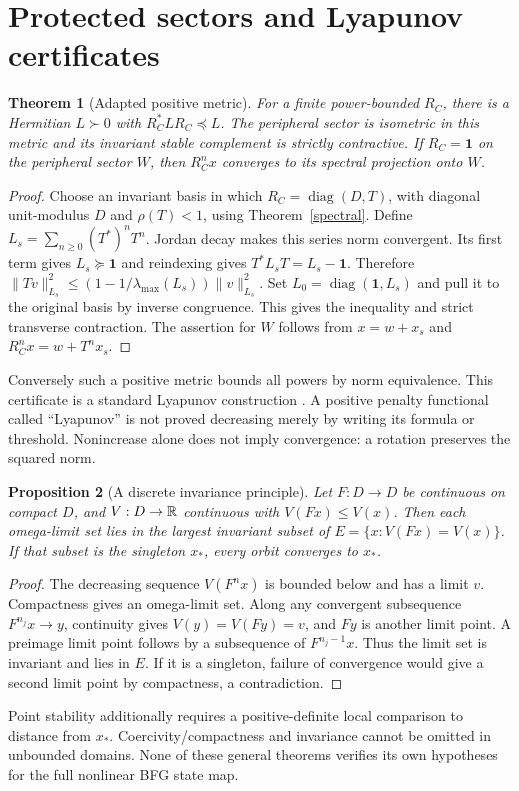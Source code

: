 \documentclass[11pt,letterpaper]{article}
\newcommand{\diag}{\operatorname{diag}}
\newcommand{\Id}{\mathbf 1}
\newtheorem{theorem}{Theorem}[section]
\newtheorem{proposition}[theorem]{Proposition}
\theoremstyle{definition}
\numberwithin{equation}{section}
\begin{document}
\section{Protected sectors and Lyapunov certificates}
\begin{theorem}[Adapted positive metric]\label{lyapunov}
For a finite power-bounded $R_C$, there is a Hermitian $L\succ0$ with $R_C^*LR_C\preceq L$. The peripheral sector is isometric in this metric and its invariant stable complement is strictly contractive. If $R_C=\Id$ on the peripheral sector $W$, then $R_C^n x$ converges to its spectral projection onto $W$.
\end{theorem}
\begin{proof}
Choose an invariant basis in which $R_C=\diag(D,T)$, with diagonal unit-modulus $D$ and $\rho(T)<1$, using Theorem~\ref{spectral}. Define $L_s=\sum_{n\geq0}(T^*)^nT^n$. Jordan decay makes this series norm convergent. Its first term gives $L_s\succeq\Id$ and reindexing gives $T^*L_sT=L_s-\Id$. Therefore $\|Tv\|_{L_s}^2\leq(1-1/\lambda_{\max}(L_s))\|v\|_{L_s}^2$. Set $L_0=\diag(\Id,L_s)$ and pull it to the original basis by inverse congruence. This gives the inequality and strict transverse contraction. The assertion for $W$ follows from $x=w+x_s$ and $R_C^nx=w+T^nx_s$.
\end{proof}
Conversely such a positive metric bounds all powers by norm equivalence. This certificate is a standard Lyapunov construction \cite{boyd}. A positive penalty functional called ``Lyapunov'' is not proved decreasing merely by writing its formula or threshold. Nonincrease alone does not imply convergence: a rotation preserves the squared norm.

\begin{proposition}[A discrete invariance principle]\label{lasalle}
Let $F:D\to D$ be continuous on compact $D$, and $V:D\to\mathbb R$ continuous with $V(Fx)\leq V(x)$. Then each omega-limit set lies in the largest invariant subset of $E=\{x:V(Fx)=V(x)\}$. If that subset is the singleton $x_*$, every orbit converges to $x_*$.
\end{proposition}
\begin{proof}
The decreasing sequence $V(F^nx)$ is bounded below and has a limit $v$. Compactness gives an omega-limit set. Along any convergent subsequence $F^{n_j}x\to y$, continuity gives $V(y)=V(Fy)=v$, and $Fy$ is another limit point. A preimage limit point follows by a subsequence of $F^{n_j-1}x$. Thus the limit set is invariant and lies in $E$. If it is a singleton, failure of convergence would give a second limit point by compactness, a contradiction.
\end{proof}
Point stability additionally requires a positive-definite local comparison to distance from $x_*$. Coercivity/compactness and invariance cannot be omitted in unbounded domains. None of these general theorems verifies its own hypotheses for the full nonlinear BFG state map.
\end{document}
